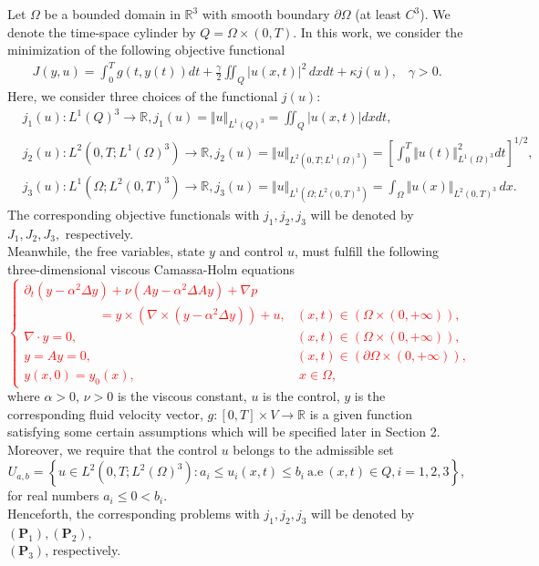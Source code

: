 \documentclass[reqno]{amsart}
\begin{document}
	Let $\Omega$ be a bounded domain in $\mathbb{R}^3$ with smooth boundary $\partial \Omega$ (at least $C^3$). We denote the time-space cylinder by $Q=\Omega\times (0,T)$.  In this work, we consider the minimization of the following objective functional
	\begin{align*}
		J(y,u)= \int_{0}^{T}g(t,y(t))dt + \frac{\gamma}{2} \iint_Q\vert u(x,t)\vert^2 \, dxdt + \kappa j(u), \hspace{10pt} \gamma>0.
	\end{align*}
	Here, we consider three choices of the functional $j(u)$:
	\begin{align}
		&j_1 (u): L^1(Q)^3 \rightarrow \mathbb{R}, j_1(u)=\Vert u\Vert_{L^1(Q)^3}= \iint_Q \vert u(x,t)\vert dxdt,\\
		&j_2(u): L^2(0,T;L^1(\Omega)^3) \rightarrow \mathbb{R}, j_2(u)=\Vert u \Vert_{L^2(0,T;L^1(\Omega)^3)}=\left[ \int_0^T \Vert u(t) \Vert_{L^1(\Omega)^3}^2 dt \right] ^{1/2},\\
		&j_3(u): L^1(\Omega;L^2(0,T)^3) \rightarrow \mathbb{R}, j_3(u)=\Vert u\Vert_{L^1(\Omega;L^2(0,T)^3)}=\int_\Omega \Vert u(x) \Vert_{L^2(0,T)^3} \,dx.
	\end{align}
	The corresponding objective functionals with $j_1, j_2, j_3$ will be denoted by $J_1, J_2, J_3,$ respectively. \\
	Meanwhile, the free variables, state $y$ and control $u$, must fulfill the following three-dimensional viscous Camassa-Holm equations \textcolor{red}{
		\begin{equation}\label{1.1}
			\begin{cases}
				\partial_{t}\left ( y-\alpha ^{2} \Delta y \right )+\nu  \left (Ay-\alpha ^{2} \Delta Ay  \right ) + \nabla p\\
				\hspace{70pt}= y \times \left ( \nabla\times\left ( y-\alpha ^{2}\Delta y \right ) \right ) + u,  &(x,t) \in (\Omega \times (0,+\infty)),\\
				\nabla \cdot y = 0, &(x,t) \in (\Omega \times (0,+\infty)), \\
				y = Ay = 0,   &(x,t) \in (\partial \Omega \times (0,+\infty)),  \\
				y(x,0) = y_0(x),  &\ x\in\Omega,
			\end{cases}
	\end{equation} }
	where $\alpha>0$, $\nu>0$ is the viscous constant, $u$ is the control, $y$ is the corresponding fluid velocity vector, $g:[0,T] \times V \to \mathbb{R}$ is a given function satisfying some certain assumptions which will be specified later in Section 2.\\
	Moreover, we require that the control $u$ belongs to the admissible set 
	\[U_{a, b}=\left \{ u\in L^2(0,T;L^2(\Omega)^3): a_i \leq u_i(x,t)\leq b_i \ \text{a.e} \ (x,t)\in Q, i=1,2,3 \right\},\]
	for real numbers $a_i\leq0<b_i$. \\
	Henceforth, the corresponding problems with $j_1, j_2, j_3$ will be denoted by $(\textbf{P}_1), (\textbf{P}_2),$ \\ $(\textbf{P}_3)$, respectively.
	
\end{document}
